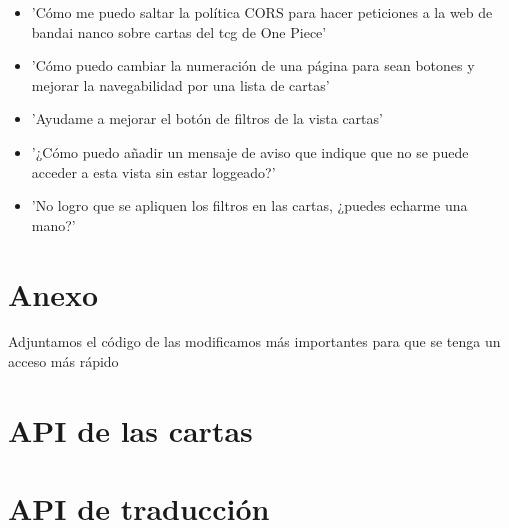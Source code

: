 \documentclass[10pt]{article}
\begin{document}
\begin{itemize}
		\item 'Cómo me puedo saltar la política CORS para hacer peticiones a la web de bandai nanco sobre cartas del tcg de One Piece'
		\item 'Cómo puedo cambiar la numeración de una página para sean botones y mejorar la navegabilidad por una lista de cartas'
		\item 'Ayudame a mejorar el botón de filtros de la vista cartas'
		\item '¿Cómo puedo añadir un mensaje de aviso que indique que no se puede acceder a esta vista sin estar loggeado?'
		\item 'No logro que se apliquen los filtros en las cartas, ¿puedes echarme una mano?'
	\end{itemize}
	\newpage
	\section*{Anexo}
	\appendix
	Adjuntamos el código de las modificamos más importantes para que se tenga un acceso más rápido 
	\section{API de las cartas}\label{JAVAAPI}
		
	\section{API de traducción}\label{JAVAGEMINI}
	
	
\end{document}
